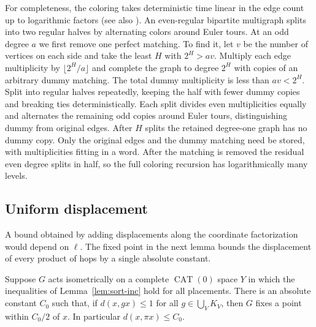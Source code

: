 For completeness, the coloring takes deterministic time linear in
the edge count up to logarithmic factors (see also \cite{color}).
An even-regular bipartite multigraph splits into two regular halves
by alternating colors around Euler tours. At an odd degree $a$ we first
remove one perfect matching. To find it, let $v$ be the number of
vertices on each side and take the least $H$ with $2^H>av$. Multiply
each edge multiplicity by $\lfloor 2^H/a\rfloor$ and complete the
graph to degree $2^H$ with copies of an arbitrary dummy matching. The
total dummy multiplicity is less than $av<2^H$. Split into regular
halves repeatedly, keeping the half with fewer dummy copies and
breaking ties deterministically. Each split divides even multiplicities
equally and alternates the remaining odd copies around Euler tours,
distinguishing dummy from original edges. After $H$ splits the retained
degree-one graph has no dummy copy. Only the original edges and the
dummy matching need be stored, with multiplicities fitting in a word.
After the matching is removed the residual even degree splits in half,
so the full coloring recursion has logarithmically many levels.

\subsection{Uniform displacement}

A bound obtained by adding displacements along the coordinate
factorization would depend on $\ell$. The fixed point in the next
lemma bounds the displacement of every product of hops by a single
absolute constant.

\begin{lemma}\label{lem:sort-geometry}
Suppose $G$ acts isometrically on a complete $\operatorname{CAT}(0)$
space $Y$ in which the inequalities of Lemma~\ref{lem:sort-inc}
hold for all placements. There is an absolute constant $C_0$ such
that, if $d(x,gx)\le1$ for all $g\in\bigcup_V K_V$, then $G$ fixes
a point within $C_0/2$ of $x$. In particular $d(x,\pi x)\le C_0$.
\end{lemma}

